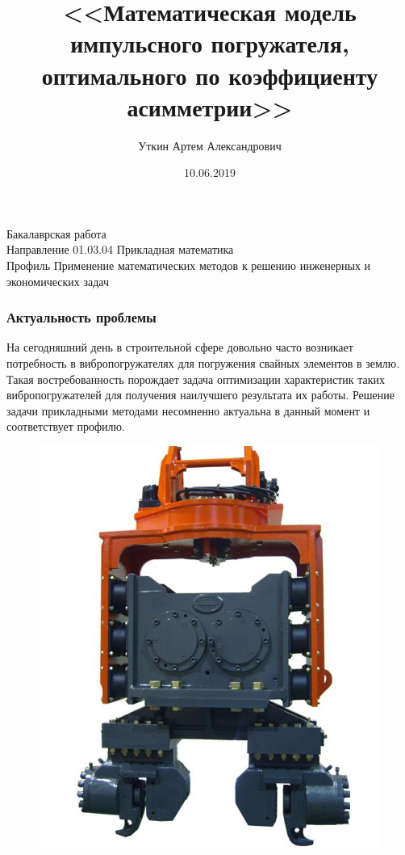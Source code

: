 \documentclass[10pt, pdf, hyperref={unicode}]{beamer}
\title{<<Математическая модель импульсного погружателя, оптимального по коэффициенту асимметрии>>}
\date{10.06.2019}
\author{Уткин Артем Александрович}
\begin{document}
    \begin{frame} %
        \titlepage
        \begin{center}
            Бакалаврская работа\\
            Направление 01.03.04 Прикладная математика\\
            Профиль Применение математических методов к решению инженерных и экономических задач
        \end{center}
    \end{frame}


    \begin{frame}
        \frametitle{Актуальность проблемы}
        \begin{center}
            \begin{minipage}[h]{0.97\linewidth}
                \begin{minipage}[h]{0.95\linewidth}
                    На сегодняшний день в строительной сфере довольно часто возникает потребность в вибропогружателях для погружения свайных элементов в землю.
                    \newline
                    Такая востребованность порождает задача оптимизации характеристик таких вибропогружателей для получения наилучшего результата их работы.
                    \newline
                    Решение задачи прикладными методами несомненно актуальна в данный момент и соответствует профилю.
                \end{minipage}
                \begin{minipage}[h]{0.25\linewidth}
                    \begin{figure}[h]
                        \centering
                        \includegraphics[width=1\linewidth]{../img/photo_1.jpg}

\end{figure}
\end{minipage}
\end{minipage}
\end{center}
\end{frame}
\end{document}
